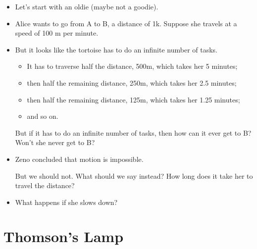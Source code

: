 \documentclass[justified]{tufte-handout}
\begin{document}
\begin{itemize}
\item Let's start with an oldie (maybe not a goodie). 



\item Alice wants to go from A to B, a distance of 1k. Suppose she travels at a speed of 100 m per minute.

\item But it looks like the tortoise has to do an infinite number of tasks. 

\begin{itemize}

\item It has to traverse half the distance, 500m, which takes her 5 minutes;

\item then half the remaining distance, 250m, which takes her 2.5 minutes;

\item then half the remaining distance, 125m, which takes her 1.25 minutes;

\item and so on.


\end{itemize}


But if it has to do an infinite number of tasks, then how can it ever get to B? Won't she never get to B?


\item Zeno concluded that motion is impossible. 

\vspace{.2cm}

\noindent But we should not. What should we say instead? How long does it take her to travel the distance?


\item What happens if she slows down? 


\end{itemize}




\section{Thomson's Lamp}
\end{document}
